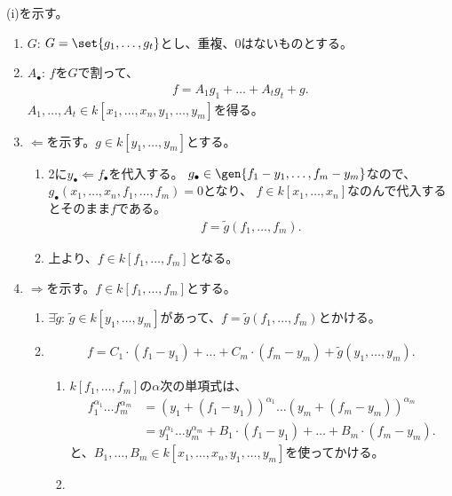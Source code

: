 \begin{myproof}
  (i)を示す。
  \begin{enumerate}
    \item $G$: $G=\set{g_1,\dots,g_t}$とし、重複、0はないものとする。
    \item
    $A_\bullet$:
    $f$を$G$で割って、
    \begin{align}
      f = A_1 g_1 + \dots + A_t g_t + g.
    \end{align}
    $A_1,\dots,A_t \in k[x_1,\dots,x_n,y_1,\dots,y_m]$を得る。
    \item
    $\Leftarrow$を示す。$g\in k[y_1,\dots,y_m]$とする。
    \begin{enumerate}
      \item
      2に$y_\bullet \Leftarrow f_\bullet$を代入する。
      $g_\bullet \in \gen{f_1-y_1,\dots,f_m-y_m}$なので、
      $g_\bullet(x_1,\dots,x_n,f_1,\dots,f_m) = 0$となり、
      $f\in k[x_1,\dots,x_n]$なのんで代入するとそのまま$f$である。
      \begin{align}
        f = \tilde g(f_1,\dots,f_m).
      \end{align}
      \item
      上より、$f\in k[f_1,\dots,f_m]$となる。
    \end{enumerate}
    \item
    $\Rightarrow$を示す。$f\in k[f_1,\dots,f_m]$とする。
    \begin{enumerate}
      \item $\exists \tilde g$: $\tilde g\in k[y_1,\dots,y_m]$があって、$f=\tilde g(f_1,\dots,f_m)$とかける。
      \item
      \begin{align}
        f = C_1\cdot (f_1-y_1) + \dots + C_m\cdot (f_m-y_m) + \tilde g(y_1,\dots,y_m).
      \end{align}
      \begin{enumerate}
        \item
        $k[f_1,\dots,f_m]$の$\alpha$次の単項式は、
        \begin{align}
          f_1^{\alpha_1} \dots f_m^{\alpha_m}
          &=
          (y_1 + (f_1 - y_1))^{\alpha_1}\dots (y_m + (f_m - y_m))^{\alpha_m}\\
          &=
          y_1^{\alpha_1}\dots y_m^{\alpha_m} + B_1\cdot (f_1-y_1) + \dots + B_m\cdot (f_m-y_m).
        \end{align}
        と、$B_1,\dots,B_m \in k[x_1,\dots,x_n,y_1,\dots,y_m]$を使ってかける。
        \item

\end{enumerate}
\end{enumerate}
\end{enumerate}
\end{myproof}
